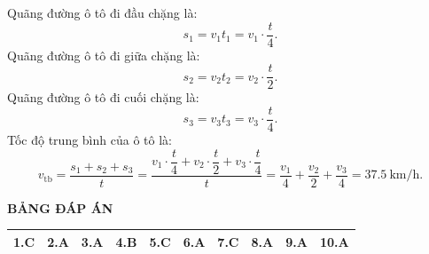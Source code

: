\begin{enumerate}[label=\bfseries Câu \arabic*:]
{	Quãng đường ô tô đi đầu chặng là:
	$$s_1=v_1t_1=v_1\cdot\dfrac{t}{4}.$$
	Quãng đường ô tô đi giữa chặng là:
	$$s_2=v_2t_2=v_2\cdot\dfrac{t}{2}.$$
	Quãng đường ô tô đi cuối chặng là:
	$$s_3=v_3t_3=v_3\cdot\dfrac{t}{4}.$$
	Tốc độ trung bình của ô tô là:
	$$v_{\text{tb}}=\dfrac{s_1+s_2+s_3}{t}=\dfrac{v_1\cdot\dfrac{t}{4}+v_2\cdot\dfrac{t}{2}+v_3\cdot\dfrac{t}{4}}{t}=\dfrac{v_1}{4}+\dfrac{v_2}{2}+\dfrac{v_3}{4}=\SI{37,5}{\km/\hour}.$$
	
}

\end{enumerate}

\whiteBGstarEnd

\loigiai
{
	\begin{center}
		\textbf{BẢNG ĐÁP ÁN}
	\end{center}
	\begin{center}
		\begin{tabular}{|m{2.8em}|m{2.8em}|m{2.8em}|m{2.8em}|m{2.8em}|m{2.8em}|m{2.8em}|m{2.8em}|m{2.8em}|m{2.8em}|}
			\hline
			1.C  & 2.A  & 3.A  & 4.B  & 5.C  & 6.A  & 7.C  & 8.A  & 9.A  & 10.A  \\
			\hline
			
		\end{tabular}
	\end{center}
}
